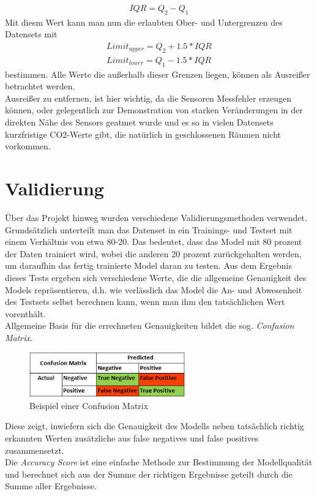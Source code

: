 \begin{align}
    IQR = Q_2 - Q_1
\end{align}
Mit diesm Wert kann man nun die erlaubten Ober- und Untergrenzen 
des Datensets mit 
\begin{align}
    Limit_{upper} = Q_2 + 1.5 * IQR \\
    Limit_{lower} = Q_1 - 1.5 * IQR
\end{align} 
bestimmen. Alle Werte die außerhalb dieser Grenzen liegen, können als Ausreißer betrachtet werden.\\
Ausreißer zu entfernen, ist hier wichtig, da die Sensoren Messfehler erzeugen können, oder gelegentlich zur 
Demonstration von starken Veränderungen in der direkten Nähe des Sensors geatmet wurde und es so in vielen 
Datensets kurzfristige CO2-Werte gibt, die natürlich in geschlossenen Räumen nicht vorkommen.

\section{Validierung}
\sloppy
Über das Projekt hinweg wurden verschiedene Validierungsmethoden verwendet. Grundsätzlich unterteilt man das 
Datenset in ein Trainings- und Testset mit einem Verhältnis von etwa 80-20. Das bedeutet, dass das Model mit
80 prozent der Daten trainiert wird, wobei die anderen 20 prozent zurückgehalten werden, um daraufhin das 
fertig trainierte Model daran zu testen. Aus dem Ergebnis dieses Tests ergeben sich verschiedene Werte, die  
die allgemeine Genauigkeit des Models repräsentieren, d.h. wie verlässlich das Model die An- und Abwesenheit 
des Testsets selbst berechnen kann, wenn man ihm den tatsächlichen Wert vorenthält.\\
Allgemeine Basis für die errechneten Genauigkeiten bildet die sog. \textit{Confusion Matrix}.

\begin{figure}[h]
    \centering
    \includegraphics[width=0.6\textwidth]{pic/confusion_matrix_ex.png}
    \caption{Beispiel einer Confusion Matrix}
    \label{fig:CV}
\end{figure}

Diese zeigt, inwiefern sich die Genauigkeit des Modells neben tatsächlich richtig erkannten Werten zusätzliche
aus false negatives und false positives zusammensetzt.\\
\newpage
Die \textit{Accuracy Score} ist eine einfache Methode zur Bestimmung der Modellqualität und berechnet sich 
aus der Summe der richtigen Ergebnisse geteilt durch die Summe aller Ergebnisse.

